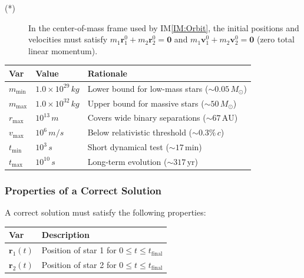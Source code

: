 \documentclass[12pt]{article}
\newcommand{\iref}[1]{IM\ref{#1}}
\begin{document}
\noindent
\begin{description}
\item[(*)] In the center-of-mass frame used by \iref{IM:Orbit}, the initial
positions and velocities must satisfy
$m_1\mathbf{r}_1^0+m_2\mathbf{r}_2^0=\mathbf{0}$ and
$m_1\mathbf{v}_1^0+m_2\mathbf{v}_2^0=\mathbf{0}$ (zero total linear momentum).
\end{description}

\begin{table}[!h]
\caption{Specification Parameter Values} \label{TblSpecParams}
\renewcommand{\arraystretch}{1.2}
\noindent \begin{longtable*}{l l l}
  \toprule
  \textbf{Var} & \textbf{Value} & \textbf{Rationale} \\
  \midrule
  $m_{\min}$ & $1.0\times 10^{29}\,\si{kg}$ & Lower bound for low-mass stars (${\sim}0.05\,M_\odot$) \\
  $m_{\max}$ & $1.0\times 10^{32}\,\si{kg}$ & Upper bound for massive stars (${\sim}50\,M_\odot$) \\
  $r_{\max}$ & $10^{13}\,\si{m}$ & Covers wide binary separations (${\sim}67\,\text{AU}$) \\
  $v_{\max}$ & $10^6\,\si{m\per s}$ & Below relativistic threshold (${\sim}0.3\%\,c$) \\
  $t_{\min}$ & $10^3\,\si{s}$ & Short dynamical test (${\sim}17\,\text{min}$) \\
  $t_{\max}$ & $10^{10}\,\si{s}$ & Long-term evolution (${\sim}317\,\text{yr}$) \\
  \bottomrule
\end{longtable*}
\end{table}

\subsubsection{Properties of a Correct Solution} \label{sec_CorrectSolution}

\noindent
A correct solution must satisfy the following properties:

\begin{table}[!h]
\caption{Output Variables} \label{TblOutputVar}
\renewcommand{\arraystretch}{1.2}
\noindent \begin{longtable*}{l l}
  \toprule
  \textbf{Var} & \textbf{Description} \\
  \midrule
  $\mathbf{r}_1(t)$ & Position of star 1 for $0 \le t \le t_{\text{final}}$ \\
  $\mathbf{r}_2(t)$ & Position of star 2 for $0 \le t \le t_{\text{final}}$ \\
  \bottomrule
\end{longtable*}
\end{table}
\end{document}

